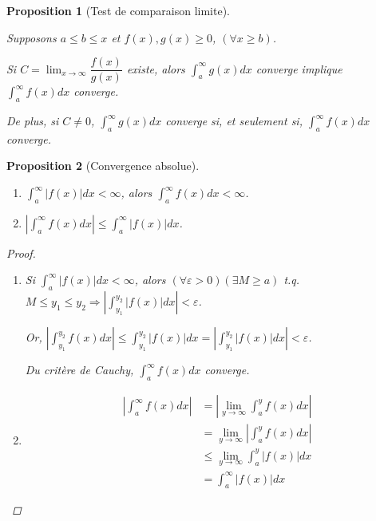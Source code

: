 \documentclass{report}
\newcommand*{\dlim}[3]{\displaystyle\lim_{#1 \to #2}#3}
\newcommand*{\dint}[3]{\displaystyle\int_{#1}^{#2}#3}
\newcommand*{\abs}[1]{\left| #1 \right|}
\newcommand*{\eps}{\varepsilon}
\newcommand*{\lte}{\leqslant}
\newcommand*{\gte}{\geqslant}
\newtheorem*{prop}{Proposition}
\theoremstyle{definition}
\theoremstyle{remark}
\begin{document}
	\begin{prop}[Test de comparaison limite]~

		Supposons $a \lte b \lte x$ et $f(x),g(x) \gte 0$, $(\forall x \gte b)$.

		Si $C = \dlim{x}{\infty}{\dfrac{f(x)}{g(x)}}$ existe, alors $\dint{a}{\infty}{g(x)dx}$ converge implique $\dint{a}{\infty}{f(x)dx}$ converge.

		De plus, si $C \neq 0$, $\dint{a}{\infty}{g(x)dx}$ converge si, et seulement si, $\dint{a}{\infty}{f(x)dx}$ converge.
	\end{prop}
	\begin{prop}[Convergence absolue]~

		\begin{enumerate}[label=\alph*)]
			\item $\dint{a}{\infty}{\abs{f(x)}dx} < \infty$, alors $\dint{a}{\infty}{f(x)dx} < \infty$.
			\item $\abs{\dint{a}{\infty}{f(x)dx}} \lte \dint{a}{\infty}{\abs{f(x)}dx}$.
		\end{enumerate}
		\begin{proof}~

			\begin{enumerate}[label=\alph*)]
				\item Si $\dint{a}{\infty}{\abs{f(x)}dx} < \infty$, alors $(\forall\eps>0) (\exists M \gte a)$ t.q. $M \lte y_1 \lte y_2 \Rightarrow \abs{\dint{y_1}{y_2}{\abs{f(x)}dx}}<\eps$.

				Or, $\abs{\dint{y_1}{y_2}{f(x)dx}} \lte \dint{y_1}{y_2}{\abs{f(x)}dx} = \abs{\dint{y_1}{y_2}{\abs{f(x)}dx}} < \eps$.

				Du crit\`ere de Cauchy, $\displaystyle\int_{a}^{\infty}f(x)dx$ converge.
				\newpage
				\item
				\begin{align*}
					\abs{\dint{a}{\infty}{f(x)dx}}&= \abs{\dlim{y}{\infty}{\dint{a}{y}{f(x)dx}}}\\
					&= \dlim{y}{\infty}{\abs{\dint{a}{y}{f(x)dx}}}\\
					&\lte \dlim{y}{\infty}{\dint{a}{y}{\abs{f(x)}dx}}\\
					&= \dint{a}{\infty}{\abs{f(x)}dx}
				\end{align*}
			\end{enumerate}
		\end{proof}
	\end{prop}
\end{document}
